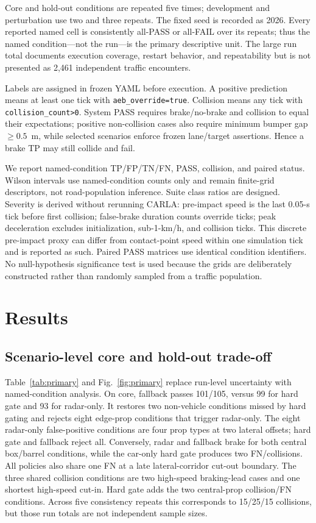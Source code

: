\documentclass[conference]{IEEEtran}
\begin{document}
Core and hold-out conditions are repeated five times; development and
perturbation use two and three repeats. The fixed seed is recorded as 2026.
Every reported named cell is consistently all-PASS or all-FAIL over its repeats;
thus the named condition---not the run---is the primary descriptive unit. The
large run total documents execution coverage, restart behavior, and repeatability
but is not presented as 2,461 independent traffic encounters.

Labels are assigned in frozen YAML before execution. A positive prediction
means at least one tick with \texttt{aeb\_override=true}. Collision means any
tick with \texttt{collision\_count>0}. System PASS requires brake/no-brake and
collision to equal their expectations; positive non-collision cases also
require minimum bumper gap $\geq0.5$~m, while selected scenarios enforce frozen
lane/target assertions. Hence a brake TP may still collide and fail.

We report named-condition TP/FP/TN/FN, PASS, collision, and paired status.
Wilson intervals use named-condition counts only and remain finite-grid
descriptors, not road-population inference. Suite class ratios are designed.
Severity is derived without rerunning CARLA: pre-impact speed is the last
0.05-s tick before first collision; false-brake duration counts override ticks;
peak deceleration excludes initialization, sub-1-km/h, and collision ticks.
This discrete pre-impact proxy can differ from contact-point speed within one
simulation tick and is reported as such. Paired PASS matrices use identical
condition identifiers. No null-hypothesis significance test is used because the
grids are deliberately constructed rather than randomly sampled from a traffic
population.

\section{Results}
\subsection{Scenario-level core and hold-out trade-off}
Table~\ref{tab:primary} and Fig.~\ref{fig:primary} replace run-level uncertainty
with named-condition analysis. On core, fallback passes 101/105, versus 99 for
hard gate and 93 for radar-only. It restores two non-vehicle conditions missed
by hard gating and rejects eight edge-prop conditions that trigger radar-only.
The eight radar-only false-positive conditions are four prop types at two
lateral offsets; hard gate and fallback reject all. Conversely, radar and
fallback brake for both central box/barrel conditions, while the car-only hard
gate produces two FN/collisions. All policies also share one FN at a late
lateral-corridor cut-out boundary. The three shared collision conditions are two
high-speed braking-lead cases and one shortest high-speed cut-in. Hard gate adds
the two central-prop collision/FN conditions. Across five consistency repeats this corresponds to 15/25/15
collisions, but those run totals are not independent sample sizes.
\end{document}
